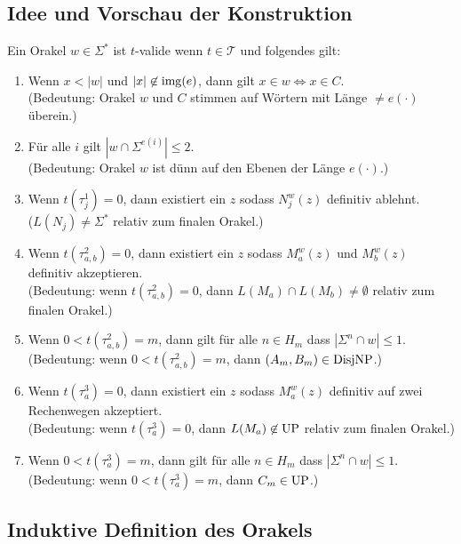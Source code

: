 \subsection*{Idee und Vorschau der Konstruktion}

Ein Orakel $w\in\Sigma^*$ ist $t$-valide wenn $t\in\mathcal T$ und folgendes gilt:
\begin{enumerate}[label={V\arabic*}]
    \item Wenn $x<|w|$ und $|x|\not\in \operatorname{img}(e)$, dann gilt $x\in w\iff x\in C$.\\
        (Bedeutung: Orakel $w$ und $C$ stimmen auf Wörtern mit Länge $\neq e(\cdot)$ überein.)
    \item Für alle $i$ gilt $|w\cap \Sigma^{e(i)}|\leq 2$.\\
        (Bedeutung: Orakel $w$ ist dünn auf den Ebenen der Länge $e(\cdot)$.)
    \item Wenn $t(\tau^1_j)=0$, dann existiert ein $z$ sodass $N_j^w(z)$ definitiv ablehnt.\\
        ($L(N_j)\neq \Sigma^*$ relativ zum finalen Orakel.)
    \item Wenn $t(\tau^2_{a,b})=0$, dann existiert ein $z$ sodass $M_a^w(z)$ und $M_b^w(z)$ definitiv akzeptieren.\\
        (Bedeutung: wenn $t(\tau^2_{a,b})=0$, dann $L(M_a)\cap L(M_b)\neq \emptyset$ relativ zum finalen Orakel.)
    \item Wenn $0<t(\tau^2_{a,b})=m$, dann gilt für alle $n\in H_m$ dass $|\Sigma^{n}\cap w|\leq 1$.\\
        (Bedeutung: wenn $0<t(\tau^2_{a,b})=m$, dann $(A_m,B_m)\in\mathrm{DisjNP}$.)
    \item Wenn $t(\tau^3_{a})=0$, dann existiert ein $z$ sodass $M_a^w(z)$ definitiv auf zwei Rechenwegen akzeptiert.\\
        (Bedeutung: wenn $t(\tau^3_{a})=0$, dann $L(M_a)\not\in \mathrm{UP}$ relativ zum finalen Orakel.)
    \item Wenn $0<t(\tau^3_{a})=m$, dann gilt für alle $n\in H_m$ dass $|\Sigma^n\cap w|\leq 1$.\\
        (Bedeutung: wenn $0<t(\tau^3_{a})=m$, dann $C_m\in\mathrm{UP}$.)
\end{enumerate}


\subsection*{Induktive Definition des Orakels}

